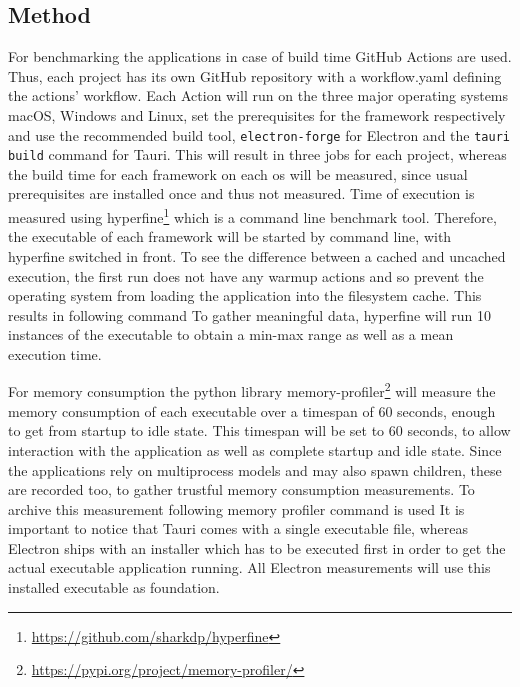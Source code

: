 \subsection{Method}
\label{subsec:method}
For benchmarking the applications in case of build time GitHub Actions are used.
Thus, each project has its own GitHub repository with a workflow.yaml defining the actions' workflow.
Each Action will run on the three major operating systems macOS, Windows and Linux, set the prerequisites for the framework respectively and use the recommended build tool, \texttt{electron-forge} for Electron and the \texttt{tauri build} command for Tauri.
This will result in three jobs for each project, whereas the build time for each framework on each os will be measured, since usual prerequisites are installed once and thus not measured.
Time of execution is measured using hyperfine\footnote{\url{https://github.com/sharkdp/hyperfine}} which is a command line benchmark tool.
Therefore, the executable of each framework will be started by command line, with hyperfine switched in front.
To see the difference between a cached and uncached execution, the first run does not have any warmup actions and so prevent the operating system from loading the application into the filesystem cache.
This results in following command 
To gather meaningful data, hyperfine will run 10 instances of the executable to obtain a min-max range as well as a mean execution time.

For memory consumption the python library memory-profiler\footnote{\url{https://pypi.org/project/memory-profiler/}} will measure the memory consumption of each executable over a timespan of 60 seconds,
enough to get from startup to idle state.
This timespan will be set to 60 seconds, to allow interaction with the application as well as complete startup and idle state.
Since the applications rely on multiprocess models and may also spawn children, these are recorded too, to gather trustful memory consumption measurements.
To archive this measurement following memory profiler command is used 
It is important to notice that Tauri comes with a single executable file, whereas Electron ships with an installer which has to be executed first in order to get the actual executable application running.
All Electron measurements will use this installed executable as foundation.

